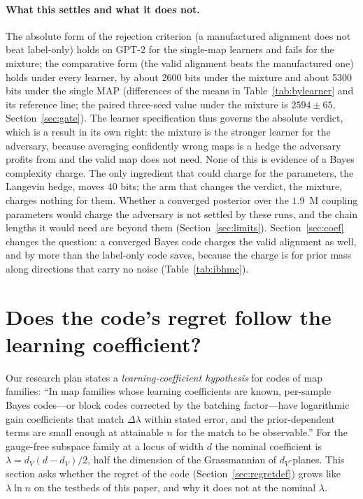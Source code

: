 \documentclass[11pt,a4paper]{article}
\newcommand{\dv}{d_V}
\begin{document}
\paragraph{What this settles and what it does not.} The absolute form of the rejection criterion (a manufactured alignment does not beat label-only) holds on GPT-2 for the single-map learners and fails for the mixture; the comparative form (the valid alignment beats the manufactured one) holds under every learner, by about 2600 bits under the mixture and about 5300 bits under the single MAP (differences of the means in Table~\ref{tab:bylearner} and its reference line; the paired three-seed value under the mixture is $2594\pm65$, Section~\ref{sec:gate}). The learner specification thus governs the absolute verdict, which is a result in its own right: the mixture is the stronger learner for the adversary, because averaging confidently wrong maps is a hedge the adversary profits from and the valid map does not need. None of this is evidence of a Bayes complexity charge. The only ingredient that could charge for the parameters, the Langevin hedge, moves 40 bits; the arm that changes the verdict, the mixture, charges nothing for them. Whether a converged posterior over the $1.9$~M coupling parameters would charge the adversary is not settled by these runs, and the chain lengths it would need are beyond them (Section~\ref{sec:limits}). Section~\ref{sec:coef} changes the question: a converged Bayes code charges the valid alignment as well, and by more than the label-only code saves, because the charge is for prior mass along directions that carry no noise (Table~\ref{tab:ibhmc}).


\section{Does the code's regret follow the learning coefficient?}
\label{sec:ha3ib}

Our research plan states a \emph{learning-coefficient hypothesis} for codes of map families: ``In map families whose learning coefficients are known, per-sample Bayes codes---or block codes corrected by the batching factor---have logarithmic gain coefficients that match $\Delta\lambda$ within stated error, and the prior-dependent terms are small enough at attainable $n$ for the match to be observable.'' For the gauge-free subspace family at a locus of width $d$ the nominal coefficient is $\lambda=\dv(d-\dv)/2$, half the dimension of the Grassmannian of $\dv$-planes. This section asks whether the regret of the code (Section~\ref{sec:regretdef}) grows like $\lambda\ln n$ on the testbeds of this paper, and why it does not at the nominal $\lambda$.
\end{document}
